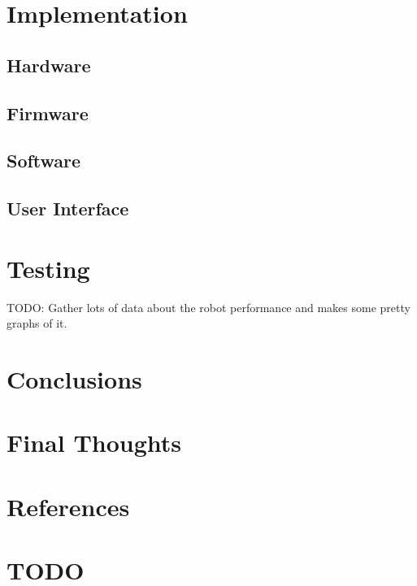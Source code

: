 \documentclass[a4paper,12pt]{article}
\begin{document}
\section{Implementation}
\subsection{Hardware}


\subsection{Firmware}


\subsection{Software}


\subsection{User Interface}


\section{Testing}


TODO: Gather lots of data about the robot performance and makes some pretty graphs of it.

\section{Conclusions}

\section{Final Thoughts}


\section{References}


\section{TODO}

\end{document}
